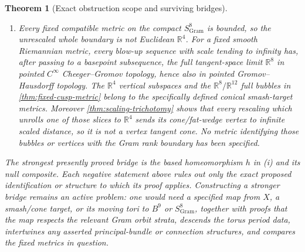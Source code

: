 \documentclass[11pt,letterpaper]{article}
\numberwithin{equation}{section}
\newtheorem{theorem}{Theorem}[section]
\theoremstyle{definition}
\theoremstyle{remark}
\newcommand{\R}{\mathbb R}
\begin{document}
\begin{theorem}[Exact obstruction scope and surviving bridges]
\begin{enumerate}[label=\textup{(\roman*)}]
\item Every fixed compatible metric on the compact
\(S^8_{\mathrm{Gram}}\) is bounded, so the unrescaled whole boundary is
not Euclidean \(\R^4\).  For a fixed smooth Riemannian metric, every
blow-up sequence with scale tending to infinity has, after passing to a
basepoint subsequence, the full tangent-space limit \(\R^8\) in pointed
\(C^\infty\) Cheeger--Gromov topology, hence also in pointed
Gromov--Hausdorff topology.  The
\(\R^4\) vertical subspaces and the \(\R^8/\R^{12}\) full bubbles in
\cref{thm:fixed-cusp-metric} belong to the specifically defined conical
smash-target metrics.  Moreover
\cref{thm:scaling-trichotomy} shows that every rescaling which unrolls
one of those slices to \(\R^4\) sends its cone/fat-wedge vertex to
infinite scaled distance, so it is not a vertex tangent cone.  No metric
identifying those bubbles or vertices with the Gram rank boundary has
been specified.
\end{enumerate}
The strongest presently proved bridge is the based homeomorphism \(h\) in
\textup{(i)} and its null composite.  Each negative statement above rules
out only the exact proposed identification or structure to which its proof
applies.  Constructing a stronger bridge remains an active problem: one
would need a specified map from \(X\), a smash/cone target, or its moving
tori to \(B^9\) or \(S^8_{\mathrm{Gram}}\), together with proofs that the
map respects the relevant Gram orbit strata, descends the torus period
data, intertwines any asserted principal-bundle or connection structures,
and compares the fixed metrics in question.
\end{theorem}
\end{document}
